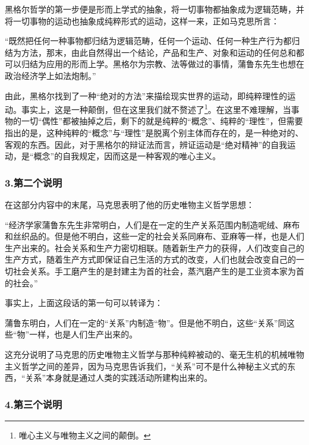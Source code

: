 \documentclass[a4paper,twoside,12pt,AutoFakeBold]{ctexart}
\begin{document}
黑格尔哲学的第一步便是形而上学式的抽象，将一切事物都抽象成为逻辑范畴，并将一切事物的运动也抽象成纯粹形式的运动，这样一来，正如马克思所言：

\begin{adjustwidth}{2em}{2em}
    \qquad\fangsong
    “既然把任何一种事物都归结为逻辑范畴，任何一个运动、任何一种生产行为都归结为方法，那末，由此自然得出一个结论，产品和生产、对象和运动的任何总和都可以归结为应用的形而上学。黑格尔为宗教、法等做过的事情，蒲鲁东先生也想在政治经济学上如法炮制。”
\end{adjustwidth}

由此，黑格尔找到了一种“绝对的方法”来描绘现实世界的运动，即纯粹理性的运动。事实上，这是一种颠倒，但在这里我们就不赘述了\footnote{唯心主义与唯物主义之间的颠倒。}。在这里不难理解，当事物的一切“偶性”都被抽掉之后，剩下的就是纯粹的“概念”、纯粹的“理性”，但需要指出的是，这种纯粹的“概念”与“理性”是脱离个别主体而存在的，是一种绝对的、客观的东西。因此，对于黑格尔的辩证法而言，辨证运动是“绝对精神”的自我运动，是“概念”的自我规定，因而这是一种客观的唯心主义。


\subsubsection{3.第二个说明}

在这部分内容中的末尾，马克思表明了他的历史唯物主义哲学思想：

\begin{adjustwidth}{2em}{2em}
    \qquad\fangsong
    “经济学家蒲鲁东先生非常明白，人们是在一定的生产关系范围内制造呢绒、麻布和丝织品的。但是他不明白，这些一定的社会关系同麻布、亚麻等一样，也是人们生产出来的。社会关系和生产力密切相联。随着新生产力的获得，人们改变自己的生产方式，随着生产方式即保证自己生活的方式的改变，人们也就会改变自己的一切社会关系。手工磨产生的是封建主为首的社会，蒸汽磨产生的是工业资本家为首的社会。”
\end{adjustwidth}

事实上，上面这段话的第一句可以转译为：

\begin{adjustwidth}{2em}{2em}
    \qquad\fangsong
    蒲鲁东明白，人们在一定的“关系”内制造“物”。但是他不明白，这些“关系”同这些“物”一样，也是人们生产出来的。
\end{adjustwidth}
这充分说明了马克思的历史唯物主义哲学与那种纯粹被动的、毫无生机的机械唯物主义哲学之间的差异，因为马克思告诉我们，“关系”可不是什么神秘主义式的东西，“关系”本身就是通过人类的实践活动所建构出来的。

\subsubsection{4.第三个说明}
\end{document}
